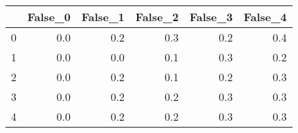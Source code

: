 \begin{tabular}{lrrrrr}
\toprule
{} &  False\_0 &  False\_1 &  False\_2 &  False\_3 &  False\_4 \\ \hline
\midrule
0 &      0.0 &      0.2 &      0.3 &      0.2 &      0.4 \\ \hline
1 &      0.0 &      0.0 &      0.1 &      0.3 &      0.2 \\ \hline
2 &      0.0 &      0.2 &      0.1 &      0.2 &      0.3 \\ \hline
3 &      0.0 &      0.2 &      0.2 &      0.3 &      0.3 \\ \hline
4 &      0.0 &      0.2 &      0.2 &      0.3 &      0.3 \\ \hline
\bottomrule
\end{tabular}
